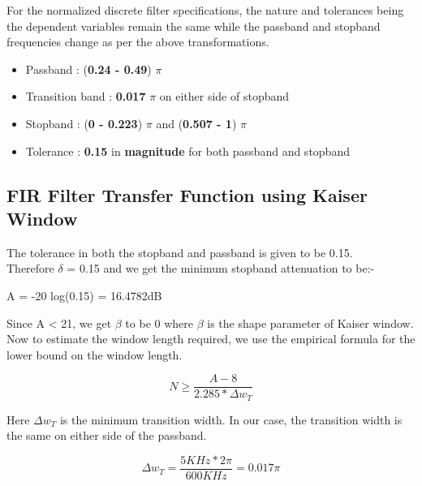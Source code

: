 \documentclass{article}
\begin{document}
\vspace{1em}
\noindent
For the normalized discrete filter specifications, the nature and tolerances being the dependent variables remain the same while the passband and stopband frequencies change as per the above transformations. 
\begin{itemize}
    \item Passband : (\textbf{0.24 -  0.49}) {$\pi$}
    \item  Transition band : \textbf{0.017} $\pi$ on either side of stopband
    \item Stopband : (\textbf{0 - 0.223}) {$\pi$} and (\textbf{0.507 - 1}) {$\pi$}
    \item  Tolerance : \textbf{0.15} in \textbf{magnitude} for both passband and stopband
\end{itemize}

\subsection{FIR Filter Transfer Function using Kaiser Window}

The tolerance in both the stopband and passband is given to be 0.15.\\
Therefore $\delta$ = 0.15 and we get the minimum stopband attenuation to be:-

\begin{center}
    A = -20 log(0.15) = 16.4782dB
\end{center}

Since A < 21, we get $\beta$ to be 0 where $\beta$ is the shape parameter of Kaiser window.\\
Now to estimate the window length required, we use the empirical formula for the lower bound on
the window length.

\begin{center}
    \begin{equation*}
        N \geq \frac{A-8}{2.285*\Delta w_T}
    \end{equation*}
\end{center}

Here $\Delta w_T$ is the minimum transition width. In our case, the transition width is the same on either
side of the passband.

\begin{center}
    \begin{equation*}
        \Delta w_T = \frac{5KHz*2\pi}{600KHz} = 0.017 \pi
    \end{equation*}
\end{center}
\end{document}
